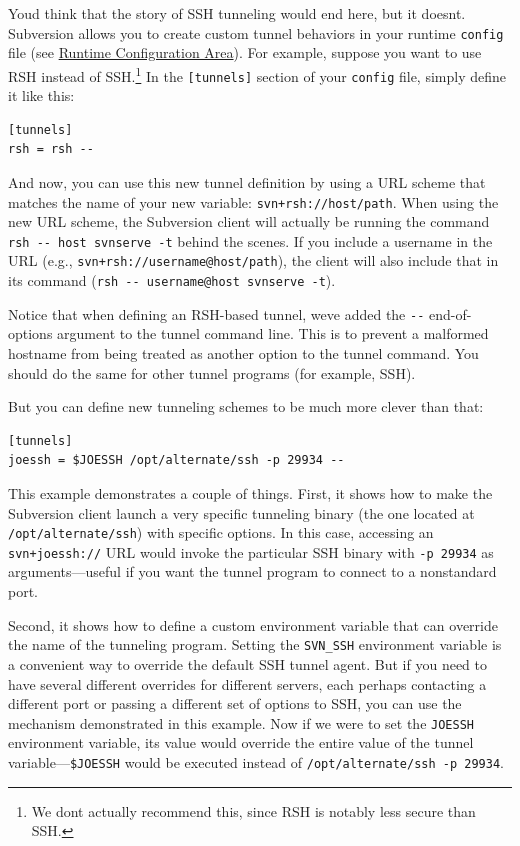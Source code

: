 You\textquotesingle d think that the story of SSH tunneling would end
here, but it doesn\textquotesingle t. Subversion allows you to create
custom tunnel behaviors in your runtime \texttt{config} file (see
\hyperref[svn.advanced.confarea]{Runtime Configuration Area}). For
example, suppose you want to use RSH instead of SSH.\footnote{We
  don\textquotesingle t actually recommend this, since RSH is notably
  less secure than SSH.} In the \texttt{{[}tunnels{]}} section of your
\texttt{config} file, simply define it like this:

\begin{verbatim}
[tunnels]
rsh = rsh --
\end{verbatim}

And now, you can use this new tunnel definition by using a URL scheme
that matches the name of your new variable:
\texttt{svn+rsh://host/path}. When using the new URL scheme, the
Subversion client will actually be running the command
\texttt{rsh\ -\/-\ host\ svnserve\ -t} behind the scenes. If you include
a username in the URL (e.g., \texttt{svn+rsh://username@host/path}), the
client will also include that in its command
(\texttt{rsh\ -\/-\ username@host\ svnserve\ -t}).

Notice that when defining an RSH-based tunnel, we\textquotesingle ve
added the \texttt{-\/-} end-of-options argument to the tunnel command
line. This is to prevent a malformed hostname from being treated as
another option to the tunnel command. You should do the same for other
tunnel programs (for example, SSH).

But you can define new tunneling schemes to be much more clever than
that:

\begin{verbatim}
[tunnels]
joessh = $JOESSH /opt/alternate/ssh -p 29934 --
\end{verbatim}

This example demonstrates a couple of things. First, it shows how to
make the Subversion client launch a very specific tunneling binary (the
one located at \texttt{/opt/alternate/ssh}) with specific options. In
this case, accessing an \texttt{svn+joessh://} URL would invoke the
particular SSH binary with \texttt{-p\ 29934} as arguments---useful if
you want the tunnel program to connect to a nonstandard port.

Second, it shows how to define a custom environment variable that can
override the name of the tunneling program. Setting the
\texttt{SVN\_SSH} environment variable is a convenient way to override
the default SSH tunnel agent. But if you need to have several different
overrides for different servers, each perhaps contacting a different
port or passing a different set of options to SSH, you can use the
mechanism demonstrated in this example. Now if we were to set the
\texttt{JOESSH} environment variable, its value would override the
entire value of the tunnel variable---\texttt{\$JOESSH} would be
executed instead of \texttt{/opt/alternate/ssh\ -p\ 29934}.

